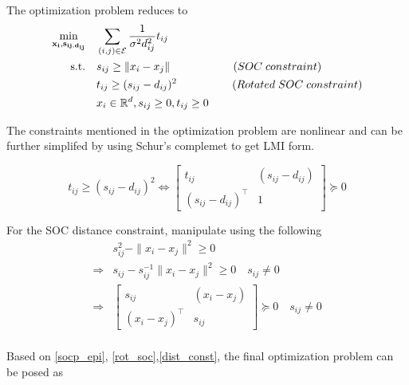 \documentclass[11pt,a4paper]{article}
\begin{document}
 The optimization problem reduces to 
 \begin{equation}
\begin{aligned}
\min_{\mathbf{x_i, s_{ij, d_{ij}}}} \quad & \sum_{(i,j) \in \mathcal{E}} \frac{1}{\sigma^2 d_{ij}^2} t_{ij} \\
\text{s.t.} \quad & s_{ij} \geq \|x_i - x_j \| \hspace{2cm} (SOC \; constraint)\\
& t_{ij}\geq (s_{ij}- d_{ij})^2 \hspace{1.75cm} (Rotated \;SOC \;constraint)\\
& x_i \in \mathbb{R}^d, s_{ij} \geq 0, t_{ij} \geq 0
\end{aligned}
\label{socp_epi}
\end{equation}

The constraints mentioned in the optimization problem are nonlinear and can be further simplifed by using Schur's complemet to get LMI form.

\begin{equation}
    t_{ij}\geq (s_{ij}- d_{ij})^2 \iff \begin{bmatrix} t_{ij} & (s_{ij}- d_{ij}) \\ (s_{ij}- d_{ij})^\top & 1
\end{bmatrix}  \succeq 0
\label{rot_soc}
\end{equation}

For the SOC distance constraint, manipulate using the following
\begin{equation}
    \begin{aligned}
        & s_{ij}^2 - \|x_i - x_j \|^2 \geq 0\\
        \Rightarrow & s_{ij} - s_{ij}^{-1}\|x_i - x_j \|^2 \geq 0 \quad s_{ij}\neq 0\\
        \Rightarrow & \begin{bmatrix} s_{ij} & (x_i- x_j) \\
        (x_i- x_j)^\top & s_{ij}\end{bmatrix} \succeq0 \quad s_{ij}\neq 0\\       
    \end{aligned}
\label{dist_const}
\end{equation}

Based on \eqref{socp_epi}, \eqref{rot_soc},\eqref{dist_const}, the final optimization problem can be posed as
\end{document}

